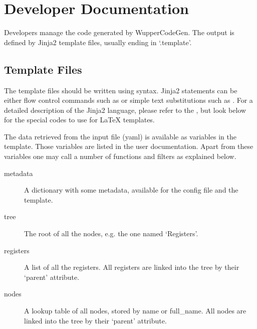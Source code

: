 \documentclass[letterpaper,10pt,english]{sphinxmanual}
\begin{document}
\section{Developer Documentation}
\label{\detokenize{developer:developer-documentation}}\label{\detokenize{developer::doc}}
Developers manage the code generated by WupperCodeGen. The output is defined by
Jinja2 template files, usually ending in `.template'.


\subsection{Template Files}
\label{\detokenize{developer:template-files}}
The template files should be written using 
syntax. Jinja2 statements can be either flow control commands such as  or simple text substitutions such as . For a
detailed description of the Jinja2 language, please refer to the , but look below for the
special codes to use for LaTeX templates.

The data retrieved from the input file (yaml) is available as variables in the
template. Those variables are listed in the user documentation. Apart from these
variables one may call a number of functions and filters as explained below.

\begin{description}
\item[{metadata}] \leavevmode
A dictionary with some metadata, available for the config file and the template.

\item[{tree}] \leavevmode
The root of all the nodes, e.g. the one named `Registers'.

\item[{registers}] \leavevmode
A list of all the registers. All registers are linked into the tree by
their `parent' attribute.

\item[{nodes}] \leavevmode
A lookup table of all nodes, stored by name or full\_name. All nodes are linked
into the tree by their `parent' attribute.

\end{description}
\end{document}
